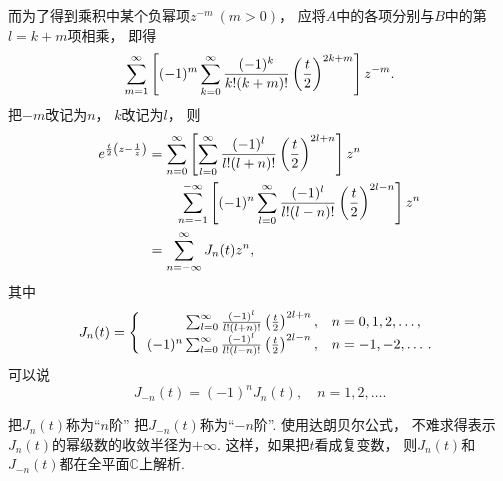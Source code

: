 \begin{example}
\begin{solution}
而为了得到乘积中某个负幂项\(z^{-m}\ (m>0)\)，
应将\(A\)中的各项分别与\(B\)中的第\(l=k+m\)项相乘，
即得\begin{equation*}
	\sum_{m=1}^\infty \left[ (-1)^m \sum_{k=0}^\infty \frac{(-1)^k}{k! (k+m)!} \left(\frac{t}{2}\right)^{2k+m} \right] z^{-m}.
\end{equation*}
把\(-m\)改记为\(n\)，
\(k\)改记为\(l\)，
则\begin{align*}
	e^{\frac{t}{2} \left(z-\frac{1}{z}\right)} &= \sum_{n=0}^\infty
	\left[
		\sum_{l=0}^\infty
		\frac{(-1)^l}{l!(l+n)!}
		\left(\frac{t}{2}\right)^{2l+n}
	\right]
	z^n \\
	&\hspace{20pt}
	\sum_{n=-1}^{-\infty}
	\left[
		(-1)^n
		\sum_{l=0}^\infty
		\frac{(-1)^l}{l!(l-n)!}
		\left(\frac{t}{2}\right)^{2l-n}
	\right]
	z^n \\
	&= \sum_{n=-\infty}^\infty J_n(t) z^n,
\end{align*}
其中\begin{equation}
	J_n(t) = \left\{ \begin{array}{rl}
		\sum_{l=0}^\infty \frac{(-1)^l}{l!(l+n)!} \left(\frac{t}{2}\right)^{2l+n},
			& n=0,1,2,\dotsc, \\
		(-1)^n \sum_{l=0}^\infty \frac{(-1)^l}{l!(l-n)!} \left(\frac{t}{2}\right)^{2l-n},
			& n=-1,-2,\dotsc.
	\end{array} \right.
\end{equation}
可以说\begin{equation*}
	J_{-n}(t) = (-1)^n J_n(t),
	\quad n=1,2,\dotsc.
\end{equation*}

把\(J_n(t)\)称为“\(n\)阶”
把\(J_{-n}(t)\)称为“\(-n\)阶”.
使用达朗贝尔公式，
不难求得表示\(J_n(t)\)的幂级数的收敛半径为\(+\infty\).
这样，如果把\(t\)看成复变数，
则\(J_n(t)\)和\(J_{-n}(t)\)都在全平面\(\mathbb{C}\)上解析.
\end{solution}
\end{example}
